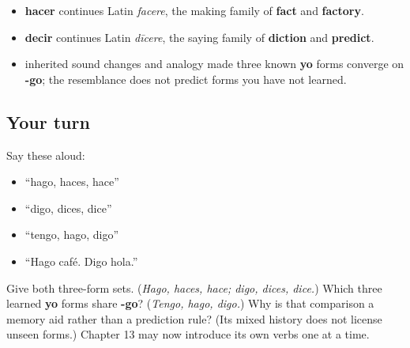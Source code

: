 \begin{cousinweb}
\begin{itemize}
\raggedright
  \item \textbf{hacer} continues Latin \emph{facere}, the making family of \textbf{fact} and \textbf{factory}.
  \item \textbf{decir} continues Latin \emph{dīcere}, the saying family of \textbf{diction} and \textbf{predict}.
  \item inherited sound changes and analogy made three known \textbf{yo} forms converge on \textbf{-go}; the resemblance does not predict forms you have not learned.
\end{itemize}
\end{cousinweb}

\subsection*{Your turn}
Say these aloud:

\begin{itemize}
\raggedright
  \item “hago, haces, hace”
  \item “digo, dices, dice”
  \item “tengo, hago, digo”
  \item “Hago café. Digo hola.”
\end{itemize}

\begin{tcolorbox}[breakable,colback=teal!4,colframe=teal!35!black,title={Before you move on}]
Give both three-form sets. (\emph{Hago, haces, hace; digo, dices, dice.}) Which three learned \textbf{yo} forms share \textbf{-go}? (\emph{Tengo, hago, digo.}) Why is that comparison a memory aid rather than a prediction rule? (Its mixed history does not license unseen forms.) Chapter 13 may now introduce its own verbs one at a time.
\end{tcolorbox}
